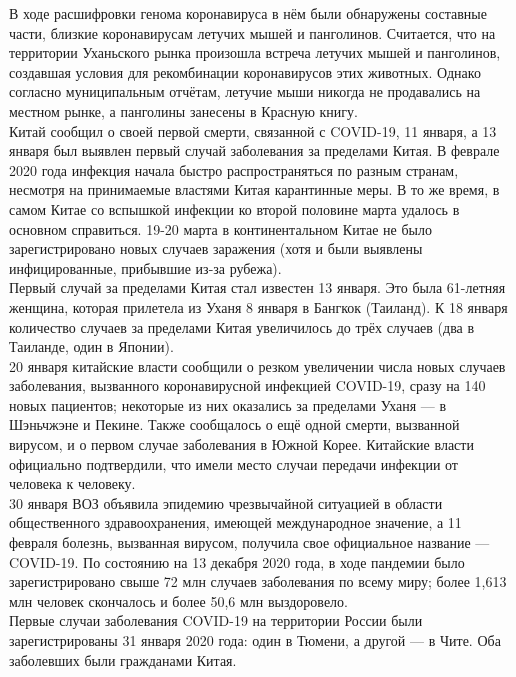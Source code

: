 \documentclass[a4paper, 12pt]{extarticle}
\begin{document}
В ходе расшифровки генома коронавируса в нём были обнаружены составные части, близкие коронавирусам летучих мышей и
панголинов. Считается, что на территории Уханьского рынка произошла встреча
летучих мышей и панголинов, создавшая условия для рекомбинации коронавирусов
этих животных. Однако согласно муниципальным отчётам, летучие мыши никогда не
продавались на местном рынке, а панголины занесены в Красную книгу.
\\

Китай сообщил о своей первой смерти, связанной с COVID-19, 11 января, а 13
января был выявлен первый случай заболевания за пределами Китая. В феврале 2020
года инфекция начала быстро распространяться по разным странам, несмотря на
принимаемые властями Китая карантинные меры. В то же время, в самом Китае со
вспышкой инфекции ко второй половине марта удалось в основном справиться. 19-20
марта в континентальном Китае не было зарегистрировано новых случаев заражения
(хотя и были выявлены инфицированные, прибывшие из-за рубежа).
\\

Первый случай за пределами Китая стал известен 13 января. Это была 61-летняя
женщина, которая прилетела из Уханя 8 января в Бангкок (Таиланд). К 18 января
количество случаев за пределами Китая увеличилось до трёх случаев (два в
Таиланде, один в Японии).
\\

20 января китайские власти сообщили о резком увеличении числа новых случаев
заболевания, вызванного коронавирусной инфекцией COVID-19, сразу на 140 новых
пациентов; некоторые из них оказались за пределами Уханя — в Шэньчжэне и
Пекине. Также сообщалось о ещё одной смерти, вызванной вирусом, и о первом
случае заболевания в Южной Корее. Китайские власти официально подтвердили, что
имели место случаи передачи инфекции от человека к человеку.
\\

30 января ВОЗ объявила эпидемию чрезвычайной ситуацией в области общественного
здравоохранения, имеющей международное значение, а 11 февраля болезнь,
вызванная вирусом, получила свое официальное название — COVID-19. По состоянию
на 13 декабря 2020 года, в ходе пандемии было зарегистрировано свыше 72 млн
случаев заболевания по всему миру; более  1,613 млн человек скончалось и более
50,6 млн выздоровело.
\\

Первые случаи заболевания COVID-19 на территории России были зарегистрированы
31 января 2020 года: один в Тюмени, а другой — в Чите. Оба заболевших были
гражданами Китая.
\newpage
\end{document}

